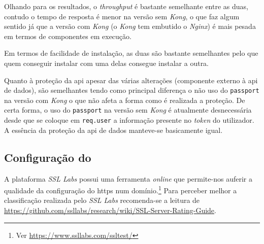 Olhando para os resultados, o \textit{throughput} é bastante semelhante entre as duas, contudo o tempo de resposta é menor na versão sem \textit{Kong}, o que faz algum sentido já que a versão com \textit{Kong} (o \textit{Kong} tem embutido o \textit{Nginx}) é mais pesada em termos de componentes em execução.

Em termos de facilidade de instalação, as duas são bastante semelhantes pelo que quem conseguir instalar com uma delas consegue instalar a outra.

Quanto à proteção da \acrshort{api} apesar das várias alterações (componente externo à \acrshort{api} de dados), são semelhantes tendo como principal diferença o não uso do \texttt{passport} na versão com \textit{Kong} o que não afeta a forma como é realizada a proteção. De certa forma, o uso do \texttt{passport} na versão sem \textit{Kong} é atualmente desnecessária desde que se coloque em \texttt{req.user} a informação presente no \textit{token} do utilizador. A essência da proteção da \acrshort{api} de dados manteve-se basicamente igual.

\subsection{Configuração do }

A plataforma \textit{SSL Labs} possui uma ferramenta \textit{online} que permite-nos auferir a qualidade da configuração do \acrshort{https} num domínio.\footnote{Ver \url{https://www.ssllabs.com/ssltest/}} Para perceber melhor a classificação realizada pelo \textit{SSL Labs} recomenda-se a leitura de \url{https://github.com/ssllabs/research/wiki/SSL-Server-Rating-Guide}.


